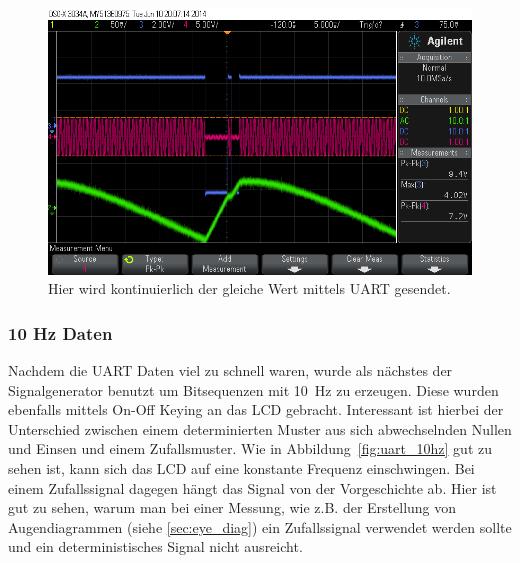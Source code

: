 \documentclass[12pt,a4paper]{article}
\begin{document}
\begin{figure}[H]
  \centering
    \includegraphics[width=\textwidth]{../measurements/20140610/uart_continous_key/scope_0.png}
  \caption{Hier wird kontinuierlich der gleiche Wert mittels UART gesendet.}
  \label{fig:uart_continous_key}
\end{figure}

\subsubsection{10 Hz Daten}
Nachdem die UART Daten viel zu schnell waren, wurde als nächstes der Signalgenerator benutzt um Bitsequenzen mit \SI{10}{\hertz} zu erzeugen. Diese wurden ebenfalls mittels On-Off Keying an das LCD gebracht. Interessant ist hierbei der Unterschied zwischen einem determinierten Muster aus sich abwechselnden Nullen und Einsen und einem Zufallsmuster. Wie in Abbildung~\ref{fig:uart_10hz} gut zu sehen ist, kann sich das LCD auf eine konstante Frequenz einschwingen. Bei einem Zufallssignal dagegen hängt das Signal von der Vorgeschichte ab. Hier ist gut zu sehen, warum man bei einer Messung, wie z.B. der Erstellung von Augendiagrammen (siehe \ref{sec:eye_diag}) ein Zufallssignal verwendet werden sollte und ein deterministisches Signal nicht ausreicht.
\end{document}
